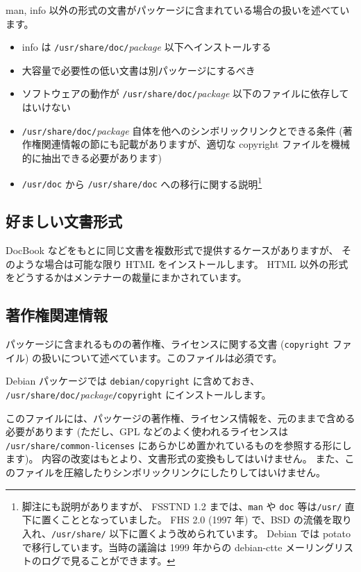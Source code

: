 \documentclass[mingoth,a4paper]{jsarticle}
\begin{document}
man, info 以外の形式の文書がパッケージに含まれている場合の扱いを述べています。

\begin{itemize}
\item info は {\tt /usr/share/doc/}{\it package} 以下へインストールする
\item 大容量で必要性の低い文書は別パッケージにするべき
\item ソフトウェアの動作が {\tt /usr/share/doc/}{\it package} 以下のファイルに依存してはいけない
\item {\tt /usr/share/doc/}{\it package} 自体を他へのシンボリックリンクとできる条件 (著作権関連情報の節にも記載がありますが、適切な copyright ファイルを機械的に抽出できる必要があります)
\item {\tt /usr/doc} から {\tt /usr/share/doc} への移行に関する説明\footnote{脚注にも説明がありますが、
FSSTND 1.2 までは、{\tt man} や {\tt doc} 等は{\tt /usr/} 直下に置くこととなっていました。
FHS 2.0 (1997 年) で、BSD の流儀を取り入れ、{\tt /usr/share/} 以下に置くよう改められています。
Debian では potato で移行しています。当時の議論は 1999 年からの debian-ctte メーリングリストのログで見ることができます。}
\end{itemize}

\subsection{好ましい文書形式}

DocBook などをもとに同じ文書を複数形式で提供するケースがありますが、
そのような場合は可能な限り HTML をインストールします。
HTML 以外の形式をどうするかはメンテナーの裁量にまかされています。

\subsection{著作権関連情報}

パッケージに含まれるものの著作権、ライセンスに関する文書 ({\tt copyright} ファイル) の扱いについて述べています。このファイルは必須です。

Debian パッケージでは {\tt debian/copyright} に含めておき、
{\tt /usr/share/doc/}{\it package}{\tt /copyright} にインストールします。

このファイルには、パッケージの著作権、ライセンス情報を、元のままで含める必要があります
(ただし、GPL などのよく使われるライセンスは {\tt /usr/share/common-licenses} にあらかじめ置かれているものを参照する形にします)。
内容の改変はもとより、文書形式の変換もしてはいけません。
また、このファイルを圧縮したりシンボリックリンクにしたりしてはいけません。
\end{document}
